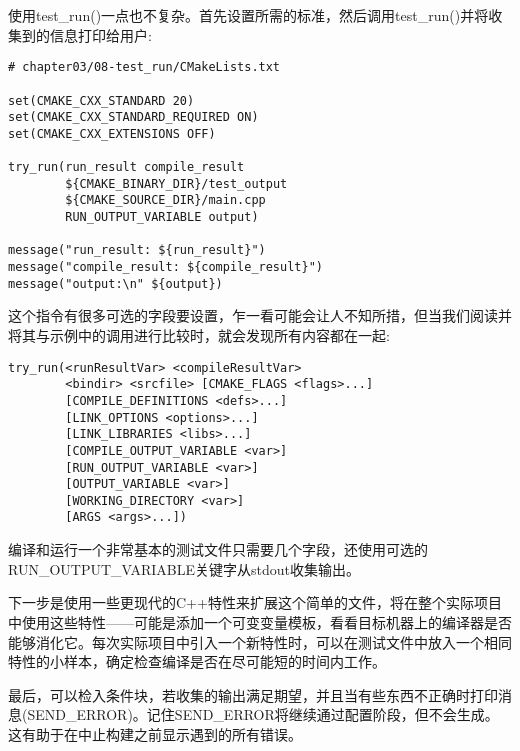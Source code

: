 使用test\_run()一点也不复杂。首先设置所需的标准，然后调用test\_run()并将收集到的信息打印给用户:

\begin{lstlisting}[style=styleCMake]
# chapter03/08-test_run/CMakeLists.txt

set(CMAKE_CXX_STANDARD 20)
set(CMAKE_CXX_STANDARD_REQUIRED ON)
set(CMAKE_CXX_EXTENSIONS OFF)

try_run(run_result compile_result
		${CMAKE_BINARY_DIR}/test_output
		${CMAKE_SOURCE_DIR}/main.cpp
		RUN_OUTPUT_VARIABLE output)
		
message("run_result: ${run_result}")
message("compile_result: ${compile_result}")
message("output:\n" ${output})
\end{lstlisting}

这个指令有很多可选的字段要设置，乍一看可能会让人不知所措，但当我们阅读并将其与示例中的调用进行比较时，就会发现所有内容都在一起:

\begin{lstlisting}[style=styleCMake]
try_run(<runResultVar> <compileResultVar>
		<bindir> <srcfile> [CMAKE_FLAGS <flags>...]
		[COMPILE_DEFINITIONS <defs>...]
		[LINK_OPTIONS <options>...]
		[LINK_LIBRARIES <libs>...]
		[COMPILE_OUTPUT_VARIABLE <var>]
		[RUN_OUTPUT_VARIABLE <var>]
		[OUTPUT_VARIABLE <var>]
		[WORKING_DIRECTORY <var>]
		[ARGS <args>...])
\end{lstlisting}

编译和运行一个非常基本的测试文件只需要几个字段，还使用可选的RUN\_OUTPUT\_VARIABLE关键字从stdout收集输出。

下一步是使用一些更现代的C++特性来扩展这个简单的文件，将在整个实际项目中使用这些特性——可能是添加一个可变变量模板，看看目标机器上的编译器是否能够消化它。每次实际项目中引入一个新特性时，可以在测试文件中放入一个相同特性的小样本，确定检查编译是否在尽可能短的时间内工作。

最后，可以检入条件块，若收集的输出满足期望，并且当有些东西不正确时打印消息(SEND\_ERROR)。记住SEND\_ERROR将继续通过配置阶段，但不会生成。这有助于在中止构建之前显示遇到的所有错误。



















